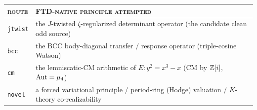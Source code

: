 \begin{table}[h]
  \centering\small
  \renewcommand{\arraystretch}{1.3}
  \begin{tabularx}{\linewidth}{@{}l >{\RaggedRight\arraybackslash}X@{}}
    \toprule
    \textsc{route} & \textsc{FTD-native principle attempted}\\
    \midrule
    \texttt{jtwist} & the $J$-twisted $\zeta$-regularized determinant operator
      (the candidate clean odd source)\\
    \texttt{bcc} & the BCC body-diagonal transfer / response operator
      (triple-cosine Watson)\\
    \texttt{cm} & the lemniscatic-CM arithmetic of $E:y^2=x^3-x$
      (CM by $\mathbb{Z}[i]$, $\operatorname{Aut}=\mu_4$)\\
    \texttt{novel} & a forced variational principle / period-ring (Hodge)
      valuation / $K$-theory co-realizability\\
    \bottomrule
  \end{tabularx}
\end{table}

